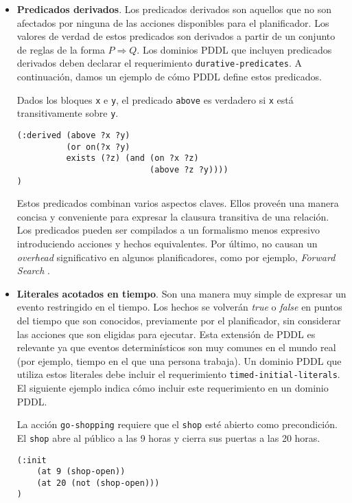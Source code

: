 	\begin{itemize}
	
	\item {\bf Predicados derivados}. Los predicados derivados son aquellos que 
	no son afectados por ninguna de las acciones disponibles para el planificador.
	Los valores de verdad de estos predicados son derivados a
        partir de un conjunto de reglas
	de la forma $P \Rightarrow Q$. 
	Los dominios PDDL que incluyen predicados derivados deben declarar el
	requerimiento \texttt{durative-predicates}.
	A continuaci\'on, damos un ejemplo de c\'omo
	PDDL define estos predicados.
	
	\begin{ejemplo}%
	
	Dados los bloques \texttt{x} e \texttt{y}, el predicado \texttt{above} es verdadero
	si \texttt{x} est\'a transitivamente sobre \texttt{y}.
	
	\begin{verbatim}
(:derived (above ?x ?y)
          (or on(?x ?y)
          exists (?z) (and (on ?x ?z)
                           (above ?z ?y))))
)             
	\end{verbatim}
	\end{ejemplo}
	
	Estos predicados combinan varios aspectos
	claves. Ellos prove\'en una manera concisa y conveniente
	para expresar la clausura transitiva de una relaci\'on.
	Los predicados pueden ser compilados a un formalismo 
	menos expresivo introduciendo acciones y hechos 
	equivalentes. Por \'ultimo, no causan un \emph{overhead}
	significativo en algunos planificadores, como por ejemplo,
	\emph{Forward Search} \cite{russell03:_artif_intel}. 
	
	\item {\bf Literales acotados en tiempo}. Son una 
	manera muy simple de expresar un evento restringido en el tiempo. 
	Los hechos se volver\'an \emph{true} o \emph{false} en puntos del tiempo
	que son conocidos, previamente por el planificador,
	sin considerar las acciones que son
	eligidas para ejecutar. Esta extensi\'on de PDDL es relevante
	ya que eventos determin\'isticos son muy comunes en el mundo real
        (por ejemplo, tiempo en el que una persona trabaja). 
        Un dominio PDDL que utiliza estos literales debe incluir
        el requerimiento \texttt{timed-initial-literals}.
        El siguiente ejemplo indica c\'omo incluir este requerimiento 
        en un dominio PDDL.
    
    \begin{ejemplo}%
    
    La acci\'on \texttt{go-shopping} requiere que el \texttt{shop}
    est\'e abierto como precondici\'on. El \texttt{shop} abre al p\'ublico
    a las 9 horas y cierra sus puertas a las 20 horas.
    
    \begin{verbatim}
(:init
    (at 9 (shop-open))
    (at 20 (not (shop-open)))
)
    \end{verbatim}
    \end{ejemplo}
    \end{itemize}



